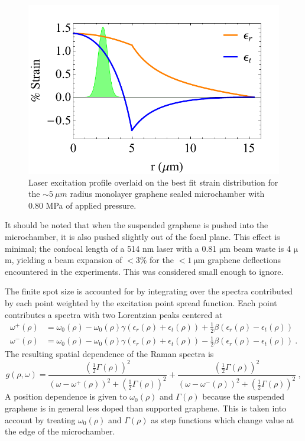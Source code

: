 \begin{figure}
	\begin{center}
	\includegraphics{Figs_Fit/SB02-1_StrainWithLaser.pdf}
	\caption[Laser excitation profile overlaid on strain distribution]{\label{Fig:Fit:FiniteSpot}Laser excitation profile overlaid on the best fit strain distribution for the $\sim 5 \ \mu m$ radius monolayer graphene sealed microchamber with 0.80 MPa of applied pressure.}
	\end{center}
\end{figure}

It should be noted that when the suspended graphene is pushed into the microchamber, it is also pushed slightly out of the focal plane.
This effect is minimal; the confocal length of a 514 nm laser with a 0.81 $\mathrm{\mu}$m beam waste is 4 $\mathrm{\mu}$m, yielding a beam expansion of $<3\%$ for the $<1 \ \mathrm{\mu m}$ graphene deflections encountered in the experiments.
This was considered small enough to ignore.

The finite spot size is accounted for by integrating over the spectra contributed by each point weighted by the excitation point spread function.
Each point contributes a spectra with two Lorentzian peaks centered at
\begin{align*}
	\omega^+ (\rho)&=\omega_0(\rho)-\omega_0(\rho) \gamma(\epsilon_{r}(\rho)+\epsilon_{t}(\rho)) 
		+ \frac{1}{2} \beta (\epsilon_{r}(\rho)-\epsilon_{t}(\rho)) \\
	\omega^-(\rho)&=\omega_0(\rho)-\omega_0(\rho) \gamma(\epsilon_{r}(\rho)+\epsilon_{t}(\rho))
		- \frac{1}{2} \beta (\epsilon_{r}(\rho)-\epsilon_{t}(\rho)) \ .
\end{align*}
The resulting spatial dependence of the Raman spectra is
\begin{equation*}
	g(\rho,\omega)=
	\frac{\left(\frac{1}{2} \Gamma(\rho) \right)^2}
	{\left(\omega-\omega^+(\rho) \right)^2+\left(\frac{1}{2} \Gamma(\rho) \right)^2}+
	\frac{\left(\frac{1}{2} \Gamma(\rho) \right)^2}
	{\left(\omega-\omega^-(\rho) \right)^2+\left(\frac{1}{2} \Gamma(\rho) \right)^2} \ ,
\end{equation*}
A position dependence is given to $\omega_0(\rho)$ and $\Gamma(\rho)$ because the suspended graphene is in general less doped than supported graphene.
This is taken into account by treating $\omega_0(\rho)$ and $\Gamma(\rho)$ as step functions which change value at the edge of the microchamber.

